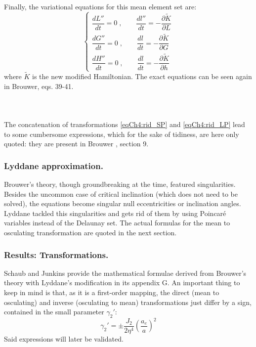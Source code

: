 		\paragraph{  \\}
		\indent Finally, the variational equations for this mean element set are:
		\begin{equation}
		\left\{ \begin{array}{ccc}
		\dfrac{dL''}{dt} = 0\; , \qquad \dfrac{dl''}{dt} = - \dfrac{\partial \tilde{K}}{\partial L} \\[1.2em]
		\dfrac{dG''}{dt} = 0\; , \qquad \dfrac{dl}{dt} = - \dfrac{\partial \tilde{K}}{\partial G} \\[1.2em]
		\dfrac{dH''}{dt} = 0\; , \qquad \dfrac{dl}{dt} = - \dfrac{\partial \tilde{K}}{\partial h}
		\end{array}\right. 
		\label{eqCh4:LPE_DOE_mean}
		\end{equation}
		\noindent where $\tilde{K}$ is the new modified Hamiltonian. The exact equations can be seen again in Brouwer, eqs. 39-41.
		\paragraph{  \\}
		\indent The concatenation of transformations \eqref{eqCh4:rid_SP} and \eqref{eqCh4:rid_LP} lead to some cumbersome expressions, which for the sake of tidiness, are here only quoted: they are present in Brouwer \cite{Brouwer}, section 9.  
		\subsubsection{Lyddane approximation.}
		\indent Brouwer's theory, though groundbreaking at the time, featured singularities. Besides the uncommon case of critical inclination (which does not need to be solved), the equations become singular null eccentricities or inclination angles. Lyddane \cite{Lyddane} tackled this singularities and gets rid of them by using Poincar\'{e} variables instead of the Delaunay set. The actual formulas for the mean to osculating transformation are quoted in the next section.
		\subsubsection{Results: Transformations.}
		\indent Schaub and Junkins \cite{Schaub_Junkins} provide the mathematical formulae derived from Brouwer's theory with Lyddane's modification in its appendix G. An important thing to keep in mind is that, as it is a first-order mapping, the direct (\ie mean to osculating) and inverse (\ie osculating to mean) transformations just differ by a sign, contained in the small parameter $\gamma_2'$:
		\[ \gamma_2' = \pm \dfrac{J_2}{2 \eta^4}\left( \dfrac{a_e}{a} \right)^2 \]
		\indent Said expressions will later be validated. 
